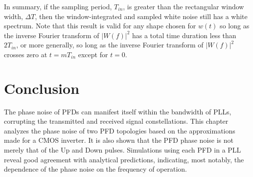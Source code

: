 In summary, if the sampling period, $T_{in}$, is greater than the rectangular window width, $\Delta T $, then the window-integrated and sampled white noise
still has a white spectrum. Note that this result is valid for any shape chosen for $w(t)$ so long as the inverse Fourier transform of $|W(f)|^2$
has a total time duration less than $2 T_{in}$, or more generally, so long as the inverse Fourier transform of $|W(f)|^2$ crosses zero at $t=m
T_{in}$ except for $t=0$.




\section{Conclusion}
The phase noise of PFDs can manifest itself within the bandwidth of PLLs, corrupting the transmitted and received signal constellations. This chapter
analyzes the phase noise of two PFD topologies based on the approximations made for a CMOS inverter. It is also shown that the PFD phase noise is
not merely that of the Up and Down pulses. Simulations using each PFD in a PLL reveal good agreement with analytical predictions, indicating, most
notably, the dependence of the phase noise on the frequency of operation.

